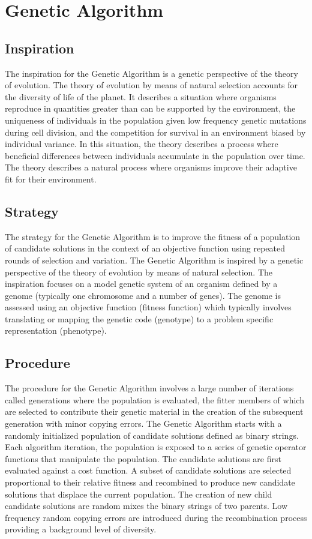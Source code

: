\section{Genetic Algorithm}

\subsection{Inspiration}
The inspiration for the Genetic Algorithm is a genetic perspective of the theory of evolution. The theory of evolution by means of natural selection accounts for the diversity of life of the planet. It describes a situation where organisms reproduce in quantities greater than can be supported by the environment, the uniqueness of individuals in the population given low frequency genetic mutations during cell division, and the competition for survival in an environment biased by individual variance. In this situation, the theory describes a process where beneficial differences between individuals accumulate in the population over time. The theory describes a natural process where organisms improve their adaptive fit for their environment.

\subsection{Strategy}
The strategy for the Genetic Algorithm is to improve the fitness of a population of candidate solutions in the context of an objective function using repeated rounds of selection and variation. The Genetic Algorithm is inspired by a genetic perspective of the theory of evolution by means of natural selection. The inspiration focuses on a model genetic system of an organism defined by a genome (typically one chromosome and a number of genes). The genome is assessed using an objective function (fitness function) which typically involves translating or mapping the genetic code (genotype) to a problem specific representation (phenotype).

\subsection{Procedure}
The procedure for the Genetic Algorithm involves a large number of iterations called generations where the population is evaluated, the fitter members of which are selected to contribute their genetic material in the creation of the subsequent generation with minor copying errors. The Genetic Algorithm starts with a randomly initialized population of candidate solutions defined as binary strings. Each algorithm iteration, the population is exposed to a series of genetic operator functions that manipulate the population. The candidate solutions are first evaluated against a cost function. A subset of candidate solutions are selected proportional to their relative fitness and recombined to produce new candidate solutions that displace the current population. The creation of new child candidate solutions are random mixes the binary strings of two parents. Low frequency random copying errors are introduced during the recombination process providing a background level of diversity.

